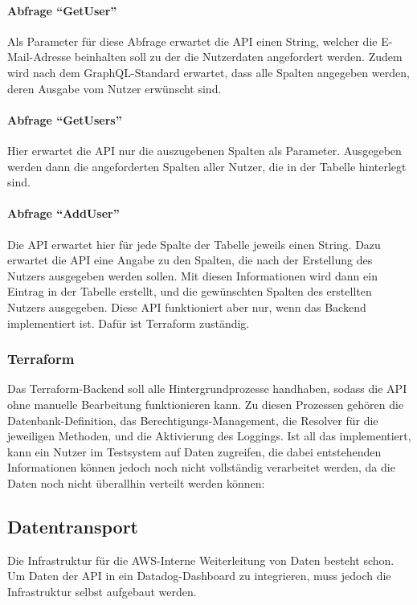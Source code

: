 \paragraph{Abfrage ``GetUser''}
Als Parameter für diese Abfrage erwartet die API einen String, welcher die E-Mail-Adresse beinhalten soll zu der die Nutzerdaten angefordert werden. Zudem wird nach dem GraphQL-Standard erwartet, dass alle Spalten angegeben werden, deren Ausgabe vom Nutzer erwünscht sind.
\paragraph{Abfrage ``GetUsers''}
Hier erwartet die API nur die auszugebenen Spalten als Parameter. Ausgegeben werden dann die angeforderten Spalten aller Nutzer, die in der Tabelle hinterlegt sind.
\paragraph{Abfrage ``AddUser''}
Die API erwartet hier für jede Spalte der Tabelle jeweils einen String. Dazu erwartet die API eine Angabe zu den Spalten, die nach der Erstellung des Nutzers ausgegeben werden sollen.  Mit diesen Informationen wird dann ein Eintrag in der Tabelle erstellt, und die gewünschten Spalten des erstellten Nutzers ausgegeben.\newline
Diese API funktioniert aber nur, wenn das Backend implementiert ist. Dafür ist Terraform zuständig.
\subsubsection{Terraform}
Das Terraform-Backend soll alle Hintergrundprozesse handhaben, sodass die API ohne manuelle Bearbeitung funktionieren kann. Zu diesen Prozessen gehören die Datenbank-Definition, das Berechtigungs-Management, die Resolver für die jeweiligen Methoden, und die Aktivierung des Loggings. Ist all das implementiert, kann ein Nutzer im Testsystem auf Daten zugreifen, die dabei entstehenden Informationen können jedoch noch nicht vollständig verarbeitet werden, da die Daten noch nicht überallhin verteilt werden können:
\subsection{Datentransport}
Die Infrastruktur für die AWS-Interne Weiterleitung von Daten besteht schon. Um Daten der API in ein Datadog-Dashboard zu integrieren, muss jedoch die Infrastruktur selbst aufgebaut werden.
